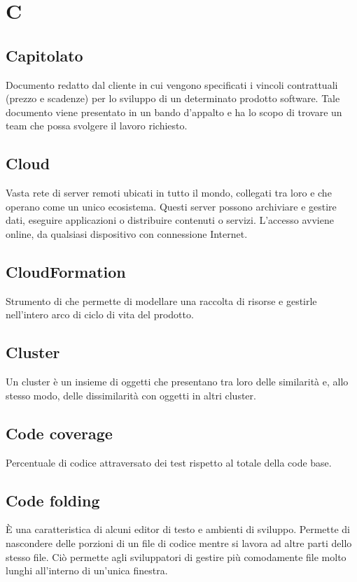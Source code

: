 \section*{C}
\markright{}

\subsection*{Capitolato}
Documento redatto dal cliente in cui vengono specificati i vincoli contrattuali (prezzo e scadenze) per lo sviluppo di un determinato prodotto software. Tale documento viene presentato in un bando d'appalto e ha lo scopo di trovare un team che possa svolgere il lavoro richiesto.

\subsection*{Cloud}
Vasta rete di server remoti ubicati in tutto il mondo, collegati tra loro e che operano come un unico ecosistema. Questi server possono archiviare e gestire dati, eseguire applicazioni o distribuire contenuti o servizi. L'accesso avviene online, da qualsiasi dispositivo con connessione Internet.

\subsection*{CloudFormation}
Strumento di  che permette di modellare una raccolta di risorse  e gestirle nell'intero arco di ciclo di vita del prodotto.

\subsection*{Cluster}
Un cluster è un insieme di oggetti che presentano tra loro delle similarità e, allo stesso modo, delle dissimilarità con oggetti in altri cluster.

\subsection*{Code coverage}
Percentuale di codice attraversato dei test rispetto al totale della code base.

\subsection*{Code folding}
È una caratteristica di alcuni editor di testo e ambienti di sviluppo. Permette di nascondere delle porzioni di un file di codice mentre si lavora ad altre parti dello stesso file. Ciò permette agli sviluppatori di gestire più comodamente file molto lunghi all'interno di un'unica finestra.

